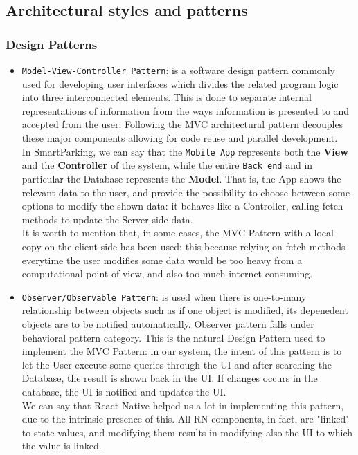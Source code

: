 \documentclass[11pt]{article} %
\begin{document}
\subsection{Architectural styles and patterns}
\subsubsection{Design Patterns}
\begin{itemize}
\item \texttt{Model-View-Controller Pattern}: is a software design pattern commonly used for developing user interfaces which divides the related program logic into three interconnected elements. This is done to separate internal representations of information from the ways information is presented to and accepted from the user. Following the MVC architectural pattern decouples these major components allowing for code reuse and parallel development. \\In SmartParking, we can say that the \texttt{Mobile App} represents both the \textbf{View} and the \textbf{Controller} of the system, while the entire \texttt{Back end} and in particular the Database represents the \textbf{Model}. That is, the App shows the relevant data to the user, and provide the possibility to choose between some options to modify the shown data: it behaves like a Controller, calling fetch methods to update the Server-side data. \\It is worth to mention that, in some cases, the MVC Pattern with a local copy on the client side has been used: this because relying on fetch methods everytime the user modifies some data would be too heavy from a computational point of view, and also too much internet-consuming.  

\item \texttt{Observer/Observable Pattern}: is used when there is one-to-many relationship between objects such as if one object is modified, its depenedent objects are to be notified automatically. Observer pattern falls under behavioral pattern category. This is the natural Design Pattern used to implement the MVC Pattern: in our system, the intent of this pattern is to let the User execute some queries through the UI and after searching the Database, the result is shown back in the UI. If changes occurs in the database, the UI is notified and updates the UI. \\We can say that React Native helped us a lot in implementing this pattern, due to the intrinsic presence of this. All RN components, in fact, are "linked" to state values, and modifying them results in modifying also the UI to which the value is linked. 
\end{itemize}
\end{document}
